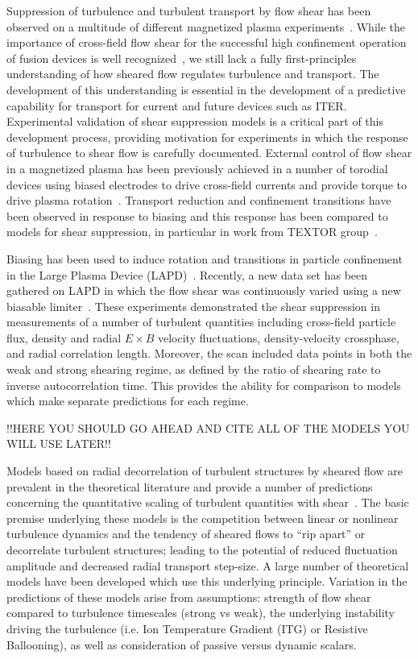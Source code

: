 \documentclass[aip,pop,amsmath,amssymb,reprint,superscriptaddress]{revtex4-1} %
\begin{document}
Suppression of turbulence and turbulent transport by flow shear has been observed on a multitude of different magnetized plasma experiments~\cite{burrell97,burrell99,terry00,oost03,sakai93,schaffner12}. While the importance of cross-field flow shear for the successful high confinement operation of fusion devices is well recognized~\cite{burrel92}, we still lack a fully first-principles understanding of how sheared flow regulates turbulence and transport.  The development of this understanding is essential in the development of a predictive capability for transport for current and future devices such as ITER. Experimental validation of shear suppression models is a critical part of this development process, providing motivation for experiments in which the response of turbulence to shear flow is carefully documented.  External control of flow shear in a magnetized plasma has been previously achieved in a number of torodial devices using biased electrodes to drive cross-field currents and provide torque to drive plasma rotation~\cite{taylor89,weynants92}.   Transport reduction and confinement transitions have been observed in response to biasing and this response has been compared to models for shear suppression, in particular in work from TEXTOR group~\cite{weynants98,boedo00,boedo02}.

Biasing has been used to induce rotation and transitions in particle confinement in the Large Plasma Device (LAPD)~\cite{maggs07,carter09}. Recently, a new data set has been gathered on LAPD in which the flow shear was continuously varied using a new biasable limiter~\cite{schaffner12}. These experiments demonstrated the shear suppression in measurements of a number of turbulent quantities including cross-field particle flux, density and radial $E\times B$ velocity fluctuations, density-velocity crossphase, and radial correlation length. Moreover, the scan included data points in both the weak and strong shearing regime, as defined by the ratio of shearing rate to inverse autocorrelation time.  This provides the ability for comparison to models which make separate predictions for each regime.

!!HERE YOU SHOULD GO AHEAD AND CITE ALL OF THE MODELS YOU WILL USE LATER!!

Models based on radial decorrelation of turbulent structures by sheared flow are prevalent in the theoretical literature and provide a number of predictions concerning the quantitative scaling of turbulent quantities with shear~\cite{terry00}. The basic premise underlying these models is the competition between linear or nonlinear turbulence dynamics and the tendency of sheared flows to ``rip apart'' or decorrelate turbulent structures; leading to the potential of reduced fluctuation amplitude and decreased radial transport step-size. A large number of theoretical models have been developed which use this underlying principle. Variation in the predictions of these models arise from assumptions: strength of flow shear compared to turbulence timescales (strong vs weak), the underlying instability driving the turbulence (i.e. Ion Temperature Gradient (ITG) or Resistive Ballooning), as well as consideration of passive versus dynamic scalars. 
\end{document}
